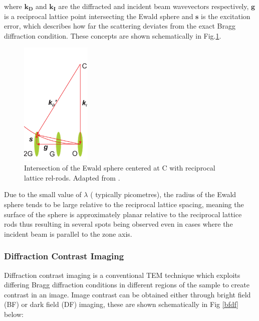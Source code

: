 where $\mathbf{k_{D}}$ and $\mathbf{k_{I}}$ are the diffracted and incident beam wavevectors respectively, $\mathbf{g}$ is a reciprocal lattice point intersecting the Ewald sphere and $\mathbf{s}$ is the excitation error, which describes how far the scattering deviates from the exact Bragg diffraction condition. These concepts are shown schematically in Fig.\ref{2.14}.

\begin{figure}[!ht]
	\centering
	\includegraphics[width=0.3\textwidth]{Figs/Ch2/ewald.png}
	\caption[h] {Intersection of the Ewald sphere centered at C with reciprocal lattice rel-rods. Adapted from \cite{Zhang2008}.}
	\label{2.14}
\end{figure}
\FloatBarrier

Due to the small value of $\lambda$ ( typically picometres), the radius of the Ewald sphere tends to be large relative to the reciprocal lattice spacing, meaning the surface of the sphere is approximately planar relative to the reciprocal lattice rods thus resulting in several spots being observed even in cases where the incident beam is parallel to the zone axis.

\subsubsection{Diffraction Contrast Imaging}
Diffraction contrast imaging is a conventional TEM technique which exploits differing Bragg diffraction conditions in different regions of the sample to create contrast in an image. Image contrast can be obtained either through bright field (BF)  or dark field (DF)  imaging, these are shown schematically in Fig \ref{bfdf} below:

